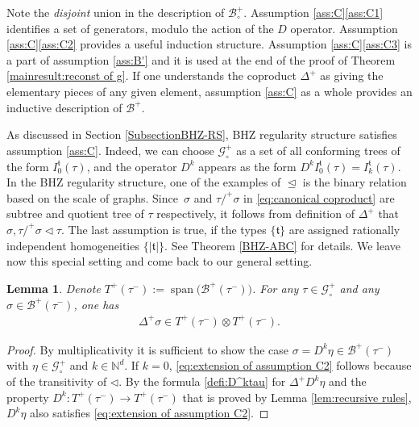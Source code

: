 \documentclass[11pt]{article}
\numberwithin{equation}{section}
\DeclareMathOperator{\Span}{span}
\theoremstyle{plain}
\newtheorem{lem}[thm]{Lemma}
\theoremstyle{definition}
\newcommand{\frkt}{\mathfrak{t}}
\let\pord\trianglelefteq
\let\spord\triangleleft
\newcommand{\bbN}{\mathbb{N}}
\newcommand{\mcB}{\mathcal{B}}
\newcommand{\mcG}{\mathcal{G}}
\begin{document}
Note the \emph{disjoint} union in the description of $\mcB_\circ^+$. Assumption \ref{ass:C}\eqref{ass:C1} identifies a set of generators, modulo the action of the $D$ operator. Assumption \ref{ass:C}\eqref{ass:C2} provides a useful induction structure. Assumption \ref{ass:C}\eqref{ass:C3} is a part of assumption \ref{ass:B'} and it is used at the end of the proof of Theorem \ref{mainresult:reconst of g}. If one understands the coproduct $\Delta^+$ as giving the elementary pieces of any given element, assumption \eqref{ass:C} as a whole provides an inductive description of $\mcB^+$.

As discussed in Section \ref{SubsectionBHZ-RS}, BHZ regularity structure satisfies assumption \eqref{ass:C}. Indeed, we can choose $\mcG_\circ^+$ as a set of all conforming trees of the form $I_0^{\mathfrak{t}}(\tau)$, and the operator $D^k$ appears as the form $D^kI_0^{\mathfrak{t}}(\tau)=I_k^{\mathfrak{t}}(\tau)$.
In the BHZ regularity structure, one of the examples of $\pord$ is the binary relation based on the scale of graphs.
Since~$\sigma$ and $\tau/^+\sigma$ in \eqref{eq:canonical coproduct} are subtree and quotient tree of $\tau$ respectively, it follows from definition of $\Delta^+$ that $\sigma,\tau/^+\sigma\spord\tau$.
The last assumption is true, if the types $\{\mathfrak{t}\}$ are assigned rationally independent homogeneities $\{|\frkt|\}$.
See Theorem \ref{BHZ-ABC} for details. We leave now this special setting and come back to our general setting.

\begin{lem}\label{extension of assumption C2}
Denote $T^+(\tau^-)\!:=\!\Span \bigl(\mcB^+(\tau^-)\bigr)$.
For any $\tau\!\in\!\mcG_\circ^+$ and any $\sigma\!\in\!\mcB^+(\tau^-)$, one has
\begin{align}\label{eq:extension of assumption C2}
\Delta^+\sigma\in T^+(\tau^-)\otimes T^+(\tau^-).
\end{align}
\end{lem}

\begin{proof}
By multiplicativity it is sufficient to show the case $\sigma=D^k\eta\in\mcB^+(\tau^-)$ with $\eta\in\mcG_\circ^+$ and $k\in\bbN^d$.
If $k=0$, \eqref{eq:extension of assumption C2} follows because of the transitivity of $\spord$.
By the formula \eqref{defi:D^ktau} for $\Delta^+D^k\eta$ and the property $D^k:T^+(\tau^-)\to T^+(\tau^-)$ that is proved by Lemma \ref{lem:recursive rules}, $D^k\eta$ also satisfies \eqref{eq:extension of assumption C2}.
\end{proof}
\end{document}
